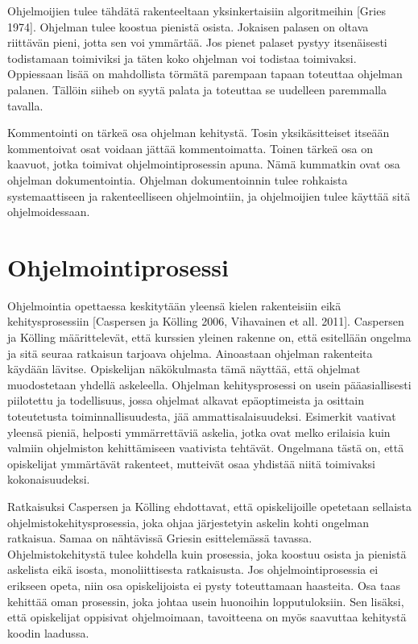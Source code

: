 \documentclass{tktltiki}
\begin{document}
Ohjelmoijien tulee tähdätä rakenteeltaan yksinkertaisiin algoritmeihin [Gries 1974]. Ohjelman tulee koostua pienistä osista. Jokaisen palasen on oltava riittävän pieni, jotta sen voi ymmärtää. Jos pienet palaset pystyy itsenäisesti todistamaan toimiviksi ja täten koko ohjelman voi todistaa toimivaksi. Oppiessaan lisää on mahdollista törmätä parempaan tapaan toteuttaa ohjelman palanen. Tällöin siiheb on syytä palata ja toteuttaa se uudelleen paremmalla tavalla.

Kommentointi on tärkeä osa ohjelman kehitystä. Tosin yksikäsitteiset itseään kommentoivat osat voidaan jättää kommentoimatta. Toinen tärkeä osa on kaavuot, jotka toimivat ohjelmointiprosessin apuna. Nämä kummatkin ovat osa ohjelman dokumentointia. Ohjelman dokumentoinnin tulee rohkaista systemaattiseen ja rakenteelliseen ohjelmointiin, ja ohjelmoijien tulee käyttää sitä ohjelmoidessaan.

\section{Ohjelmointiprosessi}

Ohjelmointia opettaessa keskitytään yleensä kielen rakenteisiin eikä kehitysprosessiin [Caspersen ja Kölling 2006, Vihavainen et all. 2011]. Caspersen ja Kölling määrittelevät, että kurssien yleinen rakenne on, että esitellään ongelma ja sitä seuraa ratkaisun tarjoava ohjelma. Ainoastaan ohjelman rakenteita käydään lävitse. Opiskelijan näkökulmasta tämä näyttää, että ohjelmat muodostetaan yhdellä askeleella. Ohjelman kehitysprosessi on usein pääasiallisesti piilotettu ja todellisuus, jossa ohjelmat alkavat epäoptimeista ja osittain toteutetusta toiminnallisuudesta, jää ammattisalaisuudeksi. Esimerkit vaativat yleensä pieniä, helposti ymmärrettäviä askelia, jotka ovat melko erilaisia kuin valmiin ohjelmiston kehittämiseen vaativista tehtävät. Ongelmana tästä on, että opiskelijat ymmärtävät rakenteet, mutteivät osaa yhdistää niitä toimivaksi kokonaisuudeksi.

Ratkaisuksi Caspersen ja Kölling ehdottavat, että opiskelijoille opetetaan sellaista ohjelmistokehitysprosessia, joka ohjaa järjestetyin askelin kohti ongelman ratkaisua. Samaa on nähtävissä Griesin esittelemässä tavassa. Ohjelmistokehitystä tulee kohdella kuin prosessia, joka koostuu osista ja pienistä askelista eikä isosta, monoliittisesta ratkaisusta. Jos ohjelmointiprosessia ei erikseen opeta, niin osa opiskelijoista ei pysty toteuttamaan haasteita. Osa taas kehittää oman prosessin, joka johtaa usein huonoihin lopputuloksiin. Sen lisäksi, että opiskelijat oppisivat ohjelmoimaan, tavoitteena on myös saavuttaa kehitystä koodin laadussa.
\end{document}
